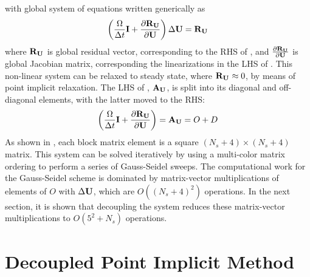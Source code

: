 with global system of equations written generically as
\begin{equation}
  \left( \frac{\Omega}{\Delta t} \mathbf I + \frac{\partial \mathbf R_{\mathbf U}}{\partial \mathbf U} \right)\Delta \mathbf U = \mathbf R_{{\mathbf U}_{}}
  \label{fc-global}
\end{equation}
where $\mathbf R_{{\mathbf U}_{}}$ is global residual vector, corresponding to the RHS of
, and $\frac{\partial \mathbf R_{\mathbf U}}{\partial \mathbf U}$ is global Jacobian matrix,
corresponding the linearizations in the LHS of . This
non-linear system can be relaxed to steady state, where $\mathbf R_{{\mathbf U}_{}} \approx 0$, by
means of point implicit relaxation.  The LHS of , $\mathbf A_{\mathbf U}$,
is split into its diagonal and off-diagonal elements, with the latter moved to
the RHS:
\begin{equation}
  \left( \frac{\Omega}{\Delta t} \mathbf I + \frac{\partial \mathbf R_{\mathbf U}}{\partial \mathbf U} \right) = 
  \mathbf A_{\mathbf U} = O+D
  \label{decomp-jac}
\end{equation}
As shown in , each block matrix element is a square
$(N_s+4)\times(N_s+4)$ matrix.  This system can be solved iteratively by using a
multi-color matrix ordering to perform a series
of Gauss-Seidel sweeps. The computational work for the Gauss-Seidel scheme is
dominated by matrix-vector multiplications of elements of $O$ with
$\Delta \mathbf U$, which are $O((N_s + 4)^2)$ operations.  In the next
section, it is shown that decoupling the system reduces these matrix-vector
multiplications to $O(5^2 + N_s)$ operations.

\section{Decoupled Point Implicit Method}

